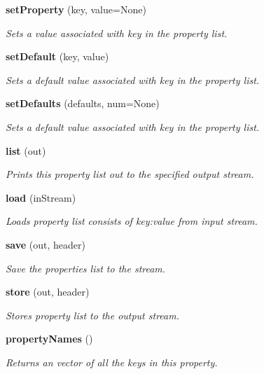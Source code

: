 \begin{CompactItemize}
{\bf set\-Property} (key, value=None)
\begin{CompactList}\small\item\em Sets a value associated with key in the property list. \item\end{CompactList}\item 
{\bf set\-Default} (key, value)
\begin{CompactList}\small\item\em Sets a default value associated with key in the property list. \item\end{CompactList}\item 
{\bf set\-Defaults} (defaults, num=None)
\begin{CompactList}\small\item\em Sets a default value associated with key in the property list. \item\end{CompactList}\item 
{\bf list} (out)
\begin{CompactList}\small\item\em Prints this property list out to the specified output stream. \item\end{CompactList}\item 
{\bf load} (in\-Stream)
\begin{CompactList}\small\item\em Loads property list consists of key:value from input stream. \item\end{CompactList}\item 
{\bf save} (out, header)
\begin{CompactList}\small\item\em Save the properties list to the stream. \item\end{CompactList}\item 
{\bf store} (out, header)
\begin{CompactList}\small\item\em Stores property list to the output stream. \item\end{CompactList}\item 
{\bf property\-Names} ()
\begin{CompactList}\small\item\em Returns an vector of all the keys in this property. \item\end{CompactList}\item 

\end{CompactItemize}
